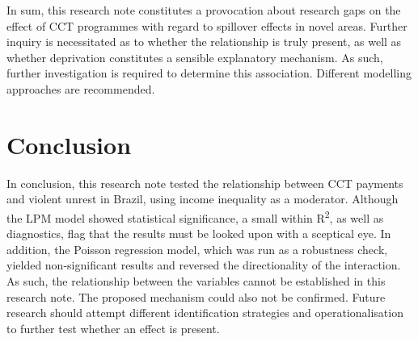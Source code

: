 \documentclass[stu,12pt]{apa7}
\begin{document}
In sum, this research note constitutes a provocation about research gaps on the effect of CCT programmes with regard to spillover effects in novel areas. Further inquiry is necessitated as to whether the relationship is truly present, as well as whether deprivation constitutes a sensible explanatory mechanism. As such, further investigation is required to determine this association. Different modelling approaches are recommended.

\section{Conclusion}

In conclusion, this research note tested the relationship between CCT payments and violent unrest in Brazil, using income inequality as a moderator. Although the LPM model showed statistical significance, a small within R\textsuperscript{2}, as well as diagnostics, flag that the results must be looked upon with a sceptical eye. In addition, the Poisson regression model, which was run as a robustness check, yielded non-significant results and reversed the directionality of the interaction. As such, the relationship between the variables cannot be established in this research note. The proposed mechanism could also not be confirmed. Future research should attempt different identification strategies and operationalisation to further test whether an effect is present.

\printbibliography
\end{document}

